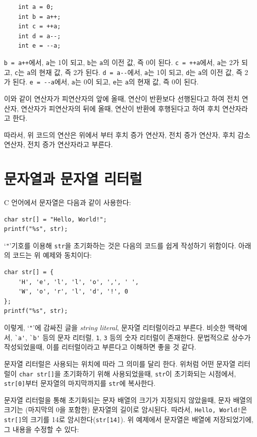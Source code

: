 \documentclass[a4paper,12pt]{book}
\newcommand{\V}[1]{\Verb|#1|}
\begin{document}
    \begin{lstlisting}
    int a = 0;
    int b = a++;
    int c = ++a;
    int d = a--;
    int e = --a;
    \end{lstlisting}

    \V{b = a++}에서, \V{a}는 1이 되고, \V{b}는 \V{a}의 이전 값, 즉 0이 된다.
    \V{c = ++a}에서, \V{a}는 2가 되고, \V{c}는 \V{a}의 현재 값, 즉 2가 된다.
    \V{d = a--}에서, \V{a}는 1이 되고, \V{d}는 \V{a}의 이전 값, 즉 2가 된다.
    \V{e = --a}에서, \V{a}는 0이 되고, \V{e}는 \V{a}의 현재 값, 즉 0이 된다.

    이와 같이 연산자가 피연산자의 앞에 올때, 연산이 반환보다 선행된다고 하여 전치 연산자,
    연산자가 피연산자의 뒤에 올때, 연산이 반환에 후행된다고 하여 후치 연산자라고 한다.

    따라서, 위 코드의 연산은 위에서 부터 후치 증가 연산자, 전치 증가 연산자,
    후치 감소 연산자, 전치 증가 연산자라고 부른다.

\section{문자열과 문자열 리터럴}

    C 언어에서 문자열은 다음과 같이 사용한다:

    \begin{lstlisting}
char str[] = "Hello, World!";
printf("%s", str);
    \end{lstlisting}

    `\V{"}'기호를 이용해 \V{str}을 초기화하는 것은 다음의 코드를 쉽게 작성하기 위함이다.
    아래의 코드는 위 예제와 동치이다:

    \begin{lstlisting}
char str[] = { 
    'H', 'e', 'l', 'l', 'o', ',', ' ', 
    'W', 'o', 'r', 'l', 'd', '!', 0 
};
printf("%s", str);
    \end{lstlisting}

    이렇게, `\V{"}'에 감싸진 글을 \textit{string literal}, 문자열 리터럴이라고 부른다.
    비슷한 맥락에서, \V{`a'}, \V{`b'} 등의 문자 리터럴, \V{1}, \V{3} 등의 숫자 리터럴이 존재한다.
    문법적으로 상수가 작성되었을때, 이를 리터럴이라고 부른다고 이해하면 좋을 것 같다.

    문자열 리터럴은 사용되는 위치에 따라 그 의미를 달리 한다.
    위처럼 어떤 문자열 리터럴이 \V{char str[]}을 초기화하기 위해 사용되었을때,
    \V{str}이 초기화되는 시점에서, \V{str[0]}부터 문자열의 마지막까지를 \V{str}에 복사한다.

    문자열 리터럴을 통해 초기화되는 문자 배열의 크기가 지정되지 않았을때,
    문자 배열의 크기는 (마지막의 0을 포함한) 문자열의 길이로 암시된다.
    따라서, \V{Hello, World!}은 \V{str[]}의 크기를 14로 암시한다(\V{str[14]}).
    위 예제에서 문자열은 배열에 저장되었기에, 그 내용을 수정할 수 있다:
\end{document}
